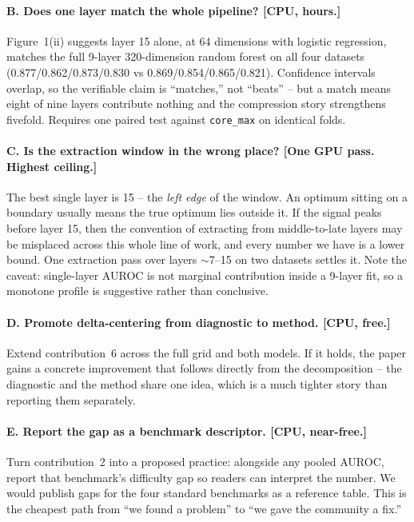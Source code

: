 \documentclass[11pt,a4paper]{article}
\begin{document}
\paragraph{B. Does one layer match the whole pipeline? [CPU, hours.]} Figure~1(ii) suggests layer
15 alone, at 64 dimensions with logistic regression, matches the full 9-layer 320-dimension random
forest on all four datasets (0.877/0.862/0.873/0.830 vs 0.869/0.854/0.865/0.821). Confidence
intervals overlap, so the verifiable claim is ``matches,'' not ``beats'' -- but a match means eight
of nine layers contribute nothing and the compression story strengthens fivefold. Requires one
paired test against \texttt{core\_max} on identical folds.

\paragraph{C. Is the extraction window in the wrong place? [One GPU pass. Highest ceiling.]} The
best single layer is 15 -- the \emph{left edge} of the window. An optimum sitting on a boundary
usually means the true optimum lies outside it. If the signal peaks before layer 15, then the
convention of extracting from middle-to-late layers may be misplaced across this whole line of
work, and every number we have is a lower bound. One extraction pass over layers $\sim$7--15 on two
datasets settles it. Note the caveat: single-layer AUROC is not marginal contribution inside a
9-layer fit, so a monotone profile is suggestive rather than conclusive.

\paragraph{D. Promote delta-centering from diagnostic to method. [CPU, free.]} Extend
contribution~6 across the full grid and both models. If it holds, the paper gains a concrete
improvement that follows directly from the decomposition -- the diagnostic and the method share one
idea, which is a much tighter story than reporting them separately.

\paragraph{E. Report the gap as a benchmark descriptor. [CPU, near-free.]} Turn contribution~2
into a proposed practice: alongside any pooled AUROC, report that benchmark's difficulty gap so
readers can interpret the number. We would publish gaps for the four standard benchmarks as a
reference table. This is the cheapest path from ``we found a problem'' to ``we gave the community
a fix.''
\end{document}
